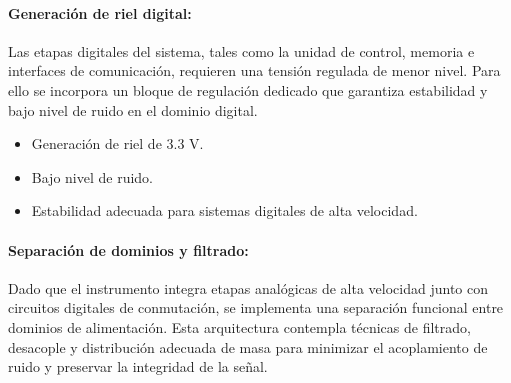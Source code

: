 \paragraph{Generación de riel digital:}
Las etapas digitales del sistema, tales como la unidad de control, memoria e interfaces de comunicación, requieren una tensión regulada de menor nivel. Para ello se incorpora un bloque de regulación dedicado que garantiza estabilidad y bajo nivel de ruido en el dominio digital.

\begin{itemize}[label=\textbullet]
	\item Generación de riel de 3.3 V.
	\item Bajo nivel de ruido.
	\item Estabilidad adecuada para sistemas digitales de alta velocidad.
\end{itemize}

\paragraph{Separación de dominios y filtrado:}
Dado que el instrumento integra etapas analógicas de alta velocidad junto con circuitos digitales de conmutación, se implementa una separación funcional entre dominios de alimentación. Esta arquitectura contempla técnicas de filtrado, desacople y distribución adecuada de masa para minimizar el acoplamiento de ruido y preservar la integridad de la señal.

%
%

